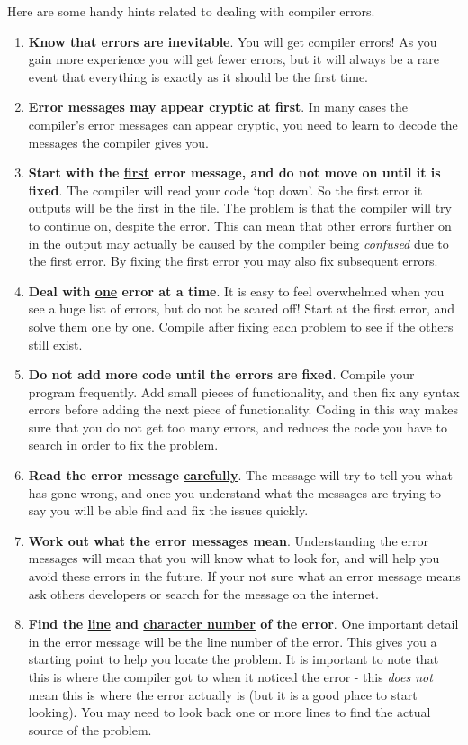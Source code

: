 Here are some handy hints related to dealing with compiler errors.

\begin{enumerate}
  \item \textbf{Know that errors are inevitable}. You will get compiler errors! As you gain more experience you will get fewer errors, but it will always be a rare event that everything is exactly as it should be the first time.
  \item \textbf{Error messages may appear cryptic at first}. In many cases the compiler's error messages can appear cryptic, you need to learn to decode the messages the compiler gives you. 
  \item \textbf{Start with the \underline{first} error message, and do not move on until it is fixed}. The compiler will read your code `top down'. So the first error it outputs will be the first in the file. The problem is that the compiler will try to continue on, despite the error. This can mean that other errors further on in the output may actually be caused by the compiler being \emph{confused} due to the first error. By fixing the first error you may also fix subsequent errors.
  \item \textbf{Deal with \underline{one} error at a time}. It is easy to feel overwhelmed when you see a huge list of errors, but do not be scared off! Start at the first error, and solve them one by one. Compile after fixing each problem to see if the others still exist.
  \item \textbf{Do not add more code until the errors are fixed}. Compile your program frequently. Add small pieces of functionality, and then fix any syntax errors before adding the next piece of functionality. Coding in this way makes sure that you do not get too many errors, and reduces the code you have to search in order to fix the problem.
  \item \textbf{Read the error message \underline{carefully}}. The message will try to tell you what has gone wrong, and once you understand what the messages are trying to say you will be able find and fix the issues quickly.
  \item  \textbf{Work out what the error messages mean}. Understanding the error messages will mean that you will know what to look for, and will help you avoid these errors in the future. If your not sure what an error message means ask others developers or search for the message on the internet.
  \item \textbf{Find the \underline{line} and \underline{character number} of the error}. One important detail in the error message will be the line number of the error. This gives you a starting point to help you locate the problem. It is important to note that this is where the compiler got to when it noticed the error - this \emph{does not} mean this is where the error actually is (but it is a good place to start looking). You may need to look back one or more lines to find the actual source of the problem.

\end{enumerate}
